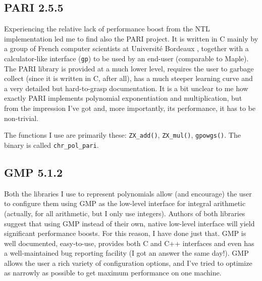 \documentclass[a4paper]{article}
\newcommand{\code}{\texttt}
\begin{document}
\subsection{PARI 2.5.5}
Experiencing the relative lack of performance boost from the NTL implementation led me to find also the PARI project. It is written in C mainly by a group of French computer scientists at Université Bordeaux \cite{pari}, together with a calculator-like interface (\code{gp}) to be used by an end-user (comparable to Maple). The PARI library is provided at a much lower level, requires the user to garbage collect (since it is written in C, after all), has a much steeper learning curve and a very detailed but hard-to-grasp documentation. It is a bit unclear to me how exactly PARI implements polynomial exponentiation and multiplication, but from the impression I've got and, more importantly, its performance, it has to be non-trivial.

The functions I use are primarily these: \code{ZX\_add()}, \code{ZX\_mul()}, \code{gpowgs()}. The binary is called \code{chr\_pol\_pari}.


\subsection{GMP 5.1.2}
Both the libraries I use to represent polynomials allow (and encourage) the user to configure them using GMP\cite{gmp} as the low-level interface for integral arithmetic (actually, for all arithmetic, but I only use integers). Authors of both libraries suggest that using GMP instead of their own, native low-level interface will yield significant performance boosts. For this reason, I have done just that. GMP is well documented, easy-to-use, provides both C and C++ interfaces and even has a well-maintained bug reporting facility (I got an answer the same day!). GMP allows the user a rich variety of configuration options, and I've tried to optimize as narrowly as possible to get maximum performance on one machine.
\end{document}
